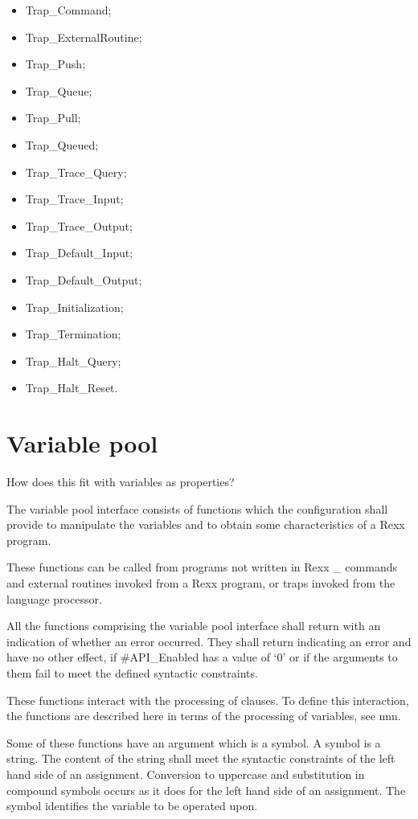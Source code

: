 \begin{itemize}
\item
  Trap\_Command;
\item
  Trap\_ExternalRoutine;
\item
  Trap\_Push;
\item
  Trap\_Queue;
\item
  Trap\_Pull;
\item
  Trap\_Queued;
\item
  Trap\_Trace\_Query;
\item
  Trap\_Trace\_Input;
\item
  Trap\_Trace\_Output;
\item
  Trap\_Default\_Input;
\item
  Trap\_Default\_Output;
\item
  Trap\_Initialization;
\item
  Trap\_Termination;
\item
  Trap\_Halt\_Query;
\item
  Trap\_Halt\_Reset.
\end{itemize}

\section{Variable pool}\label{variable-pool}

How does this fit with variables as properties?

The variable pool interface consists of functions which the
configuration shall provide to manipulate the variables and to obtain
some characteristics of a Rexx program.

These functions can be called from programs not written in Rexx \_
commands and external routines invoked from a Rexx program, or traps
invoked from the language processor.

All the functions comprising the variable pool interface shall return
with an indication of whether an error occurred. They shall return
indicating an error and have no other effect, if \#API\_Enabled has a
value of `0' or if the arguments to them fail to meet the defined
syntactic constraints.

These functions interact with the processing of clauses. To define this
interaction, the functions are described here in terms of the processing
of variables, see nnn.

Some of these functions have an argument which is a symbol. A symbol is
a string. The content of the string shall meet the syntactic constraints
of the left hand side of an assignment. Conversion to uppercase and
substitution in compound symbols occurs as it does for the left hand
side of an assignment. The symbol identifies the variable to be operated
upon.

